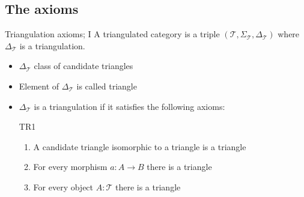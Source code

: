 \documentclass{beamer}
\begin{document}
        \subsection{The axioms}
            \begin{frame}{Triangulation axioms; I}
                A triangulated category is a triple $(\mathcal{T},\Sigma_{\mathcal{T}},\Delta_{\mathcal{T}})$ where $\Delta_{\mathcal{T}}$ is a triangulation.
                \begin{definition}[Triangulation]
                    \begin{itemize}
                        \item $\Delta_{\mathcal{T}}$ class of candidate triangles
                        \item Element of $\Delta_{\mathcal{T}}$ is called triangle
                        \item $\Delta_{\mathcal{T}}$ is a triangulation if it satisfies the following axioms:
                    \end{itemize}
                    \begin{itemize}
                        \item[TR1]  \\
                            \begin{enumerate}
                                \item A candidate triangle isomorphic to a triangle is a triangle
                                \item For every morphism $a:A\rightarrow B$ there is a triangle
                                    \begin{flushleft}
                                    \end{flushleft}
                                \item For every object $A:\mathcal{T}$ there is a triangle
                                    \begin{flushleft}
                                    \end{flushleft}
                            \end{enumerate}
                    \end{itemize}
                \end{definition}
            \end{frame}
\end{document}
